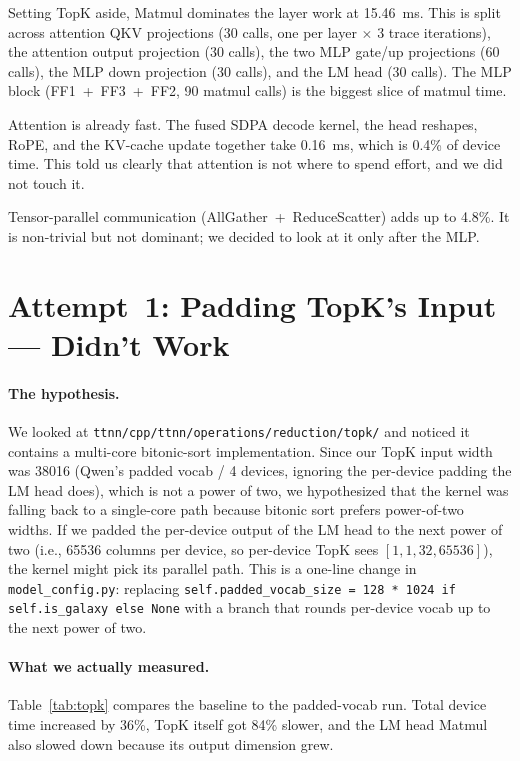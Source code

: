 \documentclass[sigplan,nonacm]{acmart}
\begin{document}
Setting TopK aside, Matmul dominates the layer work at 15.46~ms.
This is split across attention QKV projections (30 calls, one per
layer $\times$ 3 trace iterations), the attention output projection
(30 calls), the two MLP gate/up projections (60 calls), the MLP down
projection (30 calls), and the LM head (30 calls). The MLP block
(FF1~+~FF3~+~FF2, 90 matmul calls) is the biggest slice of matmul time.

Attention is already fast. The fused SDPA decode kernel, the head
reshapes, RoPE, and the KV-cache update together take 0.16~ms, which
is 0.4\% of device time. This told us clearly that attention is not
where to spend effort, and we did not touch it.

Tensor-parallel communication (AllGather~+~ReduceScatter) adds up to
4.8\%. It is non-trivial but not dominant; we decided to look at it
only after the MLP.

\section{Attempt~1: Padding TopK's Input --- Didn't Work}
\label{sec:topk}

\paragraph{The hypothesis.} We looked at
\texttt{ttnn/cpp/ttnn/operations/reduction/topk/} and noticed it
contains a multi-core bitonic-sort implementation. Since our TopK
input width was 38016 (Qwen's padded vocab / 4 devices, ignoring the
per-device padding the LM head does), which is not a power of two, we
hypothesized that the kernel was falling back to a single-core path
because bitonic sort prefers power-of-two widths. If we padded the
per-device output of the LM head to the next power of two (i.e., 65536
columns per device, so per-device TopK sees $[1,1,32,65536]$), the
kernel might pick its parallel path. This is a one-line change in
\texttt{model\_config.py}: replacing
\texttt{self.padded\_vocab\_size = 128 * 1024 if self.is\_galaxy else None}
with a branch that rounds per-device vocab up to the next power of two.

\paragraph{What we actually measured.}
Table~\ref{tab:topk} compares the baseline to the padded-vocab run.
Total device time increased by 36\%, TopK itself got 84\% slower,
and the LM head Matmul also slowed down because its output dimension
grew.
\end{document}
